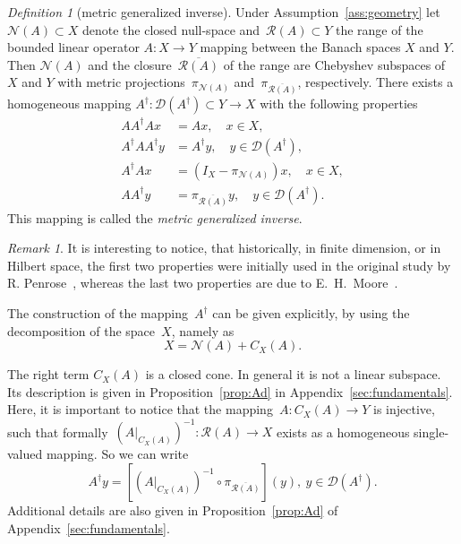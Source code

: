 \documentclass[12pt]{amsart}
\newcommand{\lr}[1]{\left(#1\right)}
\newcommand{\domain}{\mathcal D}
\newcommand{\range}{\mathcal R}
\newcommand{\N}{\mathcal N}
\newcommand{\Ad}{A^\dag}
\newcommand{\pr}{\pi_{\overline{\range(A)}}}
\theoremstyle{remark}
\newtheorem{remark}{Remark}
\newtheorem{definition}{Definition}
\begin{document}
\begin{definition}
  [metric generalized inverse]\label{def:Ad}
  Under Assumption~\ref{ass:geometry} let \linebreak $\N(A)\subset X$
  denote the closed null-space and~$\range(A) \subset Y$ the range of the bounded linear
  operator $A:X \to Y$ mapping between the Banach spaces $X$ and $Y$. Then $\N(A)$ and the closure~$\overline{\range(A)} $ of the range are Chebyshev
  subspaces of $X$ and $Y$ with metric projections~$\pi_{\N(A)}$
  and~$\pi_{\overline{\range(A)}}$, respectively. There exists a
  homogeneous mapping \linebreak $\Ad\colon\domain(\Ad)\subset Y\to X$ with the
  following properties
  \begin{align}
    A \Ad A  x&= A x,\quad x\in X,\\
    \Ad A \Ad y &= \Ad y,\quad y\in  \domain(\Ad),\\
    \Ad A x &= (I_{X} - \pi_{\N(A)}) x,\quad x\in X,
              \label{it:AMA}\\
    A \Ad y &= \pi_{\overline{\range(A)}}y,\quad y\in \domain(\Ad).\label{it:AAM}
  \end{align}
  This mapping is called the \emph{metric generalized inverse}.
\end{definition}
\begin{remark}\label{rem:domain}
  It is interesting to notice, that historically, in finite dimension, or in Hilbert space, the first two properties were
  initially used in the original study by R. Penrose~\cite{Penrose_1955}, whereas the
  last two properties are due to E.~H.~Moore~\cite{moore1920reciprocal}.
\end{remark}

The construction of the mapping~$\Ad$ can be given explicitly, by using the
decomposition of the space~$X$, namely as
\begin{equation}
  \label{eq:1}
  X = \N(A) + C_{X}(A).
\end{equation}

The right term $C_{X}(A)$ is a closed cone. In general it is not a
linear subspace. Its description is given in Proposition~\ref{prop:Ad} in
Appendix~\ref{sec:fundamentals}.
Here, it is important to notice that the mapping~$A \colon C_X(A) \to Y$
is injective, such that formally~$\lr{A|_{C_{X}(A)}}^{-1}\colon \range(A)
\to X$ exists as a homogeneous single-valued mapping. So we can write
\begin{equation}\label{eq:Ad-construct}
\Ad y = \left[\lr{A|_{C_{X}(A)}}^{-1}\circ \pr\right](y),\ y \in \domain(\Ad).
\end{equation}
Additional details are also given in Proposition~\ref{prop:Ad} of Appendix~\ref{sec:fundamentals}.
\end{document}
